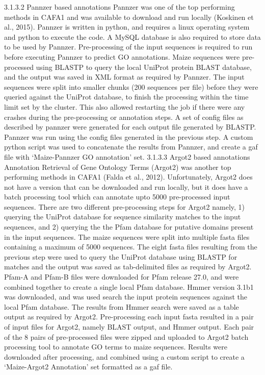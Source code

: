 3.1.3.2 Pannzer based annotations
Pannzer was one of the top performing methods in CAFA1 and was available to download and run locally (Koskinen et al., 2015). Pannzer is written in python, and requires a linux operating system and python to execute the code. A MySQL database is also required to store data to be used by Pannzer. Pre-processing of the input sequences is required to run before executing Pannzer to predict GO annotations. Maize sequences were pre-processed using BLASTP to query the local UniProt protein BLAST database, and the output was saved in XML format as required by Pannzer. The input sequences were split into smaller chunks (200 sequences per file) before they were queried against the UniProt database, to finish the processing within the time limit set by the cluster. This also allowed restarting the job if there were any crashes during the pre-processing or annotation steps. A set of config files as described by pannzer were generated for each output file generated by BLASTP. Pannzer was run using the config files generated in the previous step. A custom python script was used to concatenate the results from Pannzer, and create a gaf file with ‘Maize-Pannzer GO annotation’ set.
3.1.3.3 Argot2 based annotations
	Annotation Retrieval of Gene Ontology Terms (Argot2) was another top performing methods in CAFA1 (Falda et al., 2012). Unfortunately, Argot2 does not have a version that can be downloaded and run locally, but it does have a batch processing tool which can annotate upto 5000 pre-processed input sequences. There are two different pre-processing steps for Argot2 namely, 1) querying the UniProt database for sequence similarity matches to the input sequences, and 2) querying the the Pfam database for putative domains present in the input sequences. The maize sequences were split into multiple fasta files containing a maximum of 5000 sequences. The eight fasta files resulting from the previous step were used to query the UniProt database using BLASTP for matches and the output was saved as tab-delimited files as required by Argot2. Pfam-A and Pfam-B files were downloaded for Pfam release 27.0, and were combined together to create a single local Pfam database. Hmmer version 3.1b1 was downloaded, and was used search the input protein sequences against the local Pfam database. The results from Hmmer search were saved as a table output as required by Argot2. Pre-processing each input fasta resulted in a pair of input files for Argot2, namely BLAST output, and Hmmer output. Each pair of the 8 pairs of pre-processed files were zipped and uploaded to Argot2 batch processing tool to annotate GO terms to maize sequences. Results were downloaded after processing, and combined using a custom script to create a ‘Maize-Argot2 Annotation’ set formatted as a gaf file.

